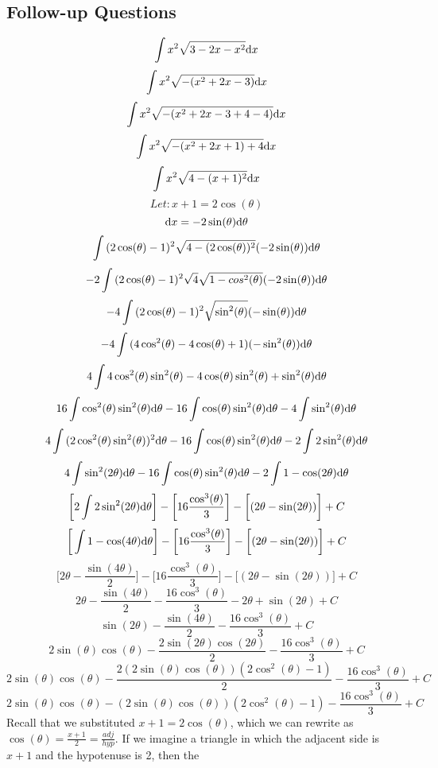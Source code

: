 \documentclass[letterpaper, 12pt]{math}
\begin{document}
\subsection*{Follow-up Questions}
\[ \int{x^{2}\sqrt{3-2x-x^{2}}\mathrm{d}{x}} \]
\[ \int{x^{2}\sqrt{-(x^{2}+2x-3)}\mathrm{d}{x}} \]
\[ \int{x^{2}\sqrt{-(x^{2}+2x-3+4-4)}\mathrm{d}{x}} \]
\[ \int{x^{2}\sqrt{-(x^{2}+2x+1)+4}\mathrm{d}{x}} \]
\[ \int{x^{2}\sqrt{4-(x+1)^{2}}\mathrm{d}{x}} \]
\[ Let: x + 1 = 2\cos(\theta) \]
\[ \mathrm{d}{x} = -2\sin(\theta)\mathrm{d}{\theta} \]
\[ \int{(2\cos(\theta)-1)^{2}\sqrt{4-(2\cos(\theta))^{2}}
   (-2\sin(\theta))\mathrm{d}{\theta}} \]
\[ -2\int{(2\cos(\theta)-1)^{2}\sqrt{4}\sqrt{1-cos^{2}(\theta)}
   (-2\sin(\theta))\mathrm{d}{\theta}} \]
\[ -4\int{(2\cos(\theta)-1)^{2}\sqrt{\sin^{2}(\theta)}
   (-\sin(\theta))\mathrm{d}{\theta}} \]
\[ -4\int{(4\cos^{2}(\theta)-4\cos(\theta)+1)
   (-\sin^{2}(\theta))\mathrm{d}{\theta}} \]
\[ 4\int{4\cos^{2}(\theta)\sin^{2}(\theta)-4\cos(\theta)\sin^{2}(\theta)+
   \sin^{2}(\theta)\mathrm{d}{\theta}} \]
\[ 16\int{\cos^{2}(\theta)\sin^{2}(\theta)\mathrm{d}{\theta}}-
   16\int{\cos(\theta)\sin^{2}(\theta)\mathrm{d}{\theta}}-
   4\int{\sin^{2}(\theta)\mathrm{d}{\theta}} \]
\[ 4\int{(2\cos^{2}(\theta)\sin^{2}(\theta))^{2}\mathrm{d}{\theta}}-
   16\int{\cos(\theta)\sin^{2}(\theta)\mathrm{d}{\theta}}-
   2\int{2\sin^{2}(\theta)\mathrm{d}{\theta}} \]
\[ 4\int{\sin^{2}(2\theta)\mathrm{d}{\theta}}-
   16\int{\cos(\theta)\sin^{2}(\theta)\mathrm{d}{\theta}}-
   2\int{1-\cos(2\theta)\mathrm{d}{\theta}} \]
\[ \bigg[2\int{2\sin^{2}(2\theta)\mathrm{d}{\theta}}\bigg]-
   \bigg[16\frac{\cos^{3}(\theta)}{3}\bigg]-
   \bigg[(2\theta-\sin(2\theta))\bigg]+C \]
\[ \bigg[\int{1-\cos(4\theta)\mathrm{d}{\theta}}\bigg]-
   \bigg[16\frac{\cos^{3}(\theta)}{3}\bigg]-
   \bigg[(2\theta-\sin(2\theta))\bigg]+C \]
\[ \bigg[2\theta-\frac{\sin(4\theta)}{2}\bigg]-
   \bigg[16\frac{\cos^{3}(\theta)}{3}\bigg]-
   \bigg[(2\theta-\sin(2\theta))\bigg]+C \]
\[ 2\theta-\frac{\sin(4\theta)}{2}-
   \frac{16\cos^{3}(\theta)}{3}-
   2\theta+\sin(2\theta)+C \]
\[ \sin(2\theta)-\frac{\sin(4\theta)}{2}-\frac{16\cos^{3}(\theta)}{3}+C \]
\[ 2\sin(\theta)\cos(\theta)-
   \frac{2\sin(2\theta)\cos(2\theta)}{2}-
   \frac{16\cos^{3}(\theta)}{3}+C \]
\[ 2\sin(\theta)\cos(\theta)-
   \frac{2(2\sin(\theta)\cos(\theta))(2\cos^{2}(\theta)-1)}{2}-
   \frac{16\cos^{3}(\theta)}{3}+C \]
\[ 2\sin(\theta)\cos(\theta)-
   (2\sin(\theta)\cos(\theta))(2\cos^{2}(\theta)-1)-
   \frac{16\cos^{3}(\theta)}{3}+C \]
Recall that we substituted \( x+1 = 2\cos(\theta) \), which we can rewrite as
\(\cos(\theta) = \frac{x+1}{2} = \frac{adj}{hyp} \). If we imagine a triangle
in which the adjacent side is \( x+1 \) and the hypotenuse is 2, then the
\end{document}
